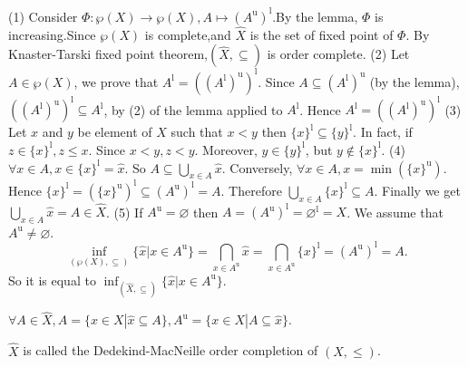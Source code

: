 \documentclass{book}
\numberwithin{equation}{section}
\begin{document}
\begin{proofenv}
    \quad
    \newline
    (1) Consider $\Phi :\wp(X)\rightarrow\wp(X),A\mapsto(A^\mathrm{u})^\mathrm{l}$.By the lemma, $\Phi $  is increasing.Since $\wp(X)$ is complete,and $\hat{X}$ is the set of fixed point of $\Phi$. By Knaster-Tarski fixed point theorem,$(\hat{X},\subseteq)$ is order complete.
    \newline
    (2) Let $A\in \wp(X)$, we prove that $A^\mathrm{l}=((A^\mathrm{l})^\mathrm{u})^\mathrm{l}$. Since $A\subseteq (A^\mathrm{l})^\mathrm{u}$ (by the lemma), $((A^\mathrm{l})^\mathrm{u})^\mathrm{l}\subseteq A^\mathrm{l}$, by (2) of the lemma applied to $A^\mathrm{l}$. Hence $A^\mathrm{l}=((A^\mathrm{l})^\mathrm{u})^\mathrm{l}$
    \newline
    (3) Let $x$ and $y$ be element of $X$ such that $x< y$ then $\{x\}^\mathrm{l}\subseteq\{y\}^\mathrm{l}$. In fact, if $z\in \{x\}^\mathrm{l},z\le x$. Since $x<y,z<y$. Moreover, $y\in \{y\}^\mathrm{l}$, but $y\notin \{x\}^\mathrm{l}$.
    \newline
    (4) $\forall x \in A,x\in \{x\}^\mathrm{l}=\hat{x}$. So $A\subseteq\bigcup_{x\in A}\hat{x}$.
    Conversely, $\forall x\in A, x=\min (\{x\}^\mathrm{u})$. Hence $\{x\}^\mathrm{l}=(\{x\}^\mathrm{u})^\mathrm{l}\subseteq (A^\mathrm{u})^\mathrm{l}=A$. Therefore $\bigcup_{x\in A}\{x\}^\mathrm{l}\subseteq A$. Finally we get $\bigcup_{x\in A}\hat{x}=A\in \hat{X}$.
    \newline
    (5) If $A^\mathrm{u}=\varnothing$ then $A=(A^\mathrm{u})^\mathrm{l}=\varnothing^\mathrm{l}=X$. We assume that $A^\mathrm{u}\not=\varnothing$.
    $$\inf _{(\wp(X),\subseteq)}\{\hat{x}|x\in A^\mathrm{u}\}=\bigcap_{x\in A^\mathrm{u}}\hat{x}=\bigcap_{x\in A^\mathrm{u}}\{x\}^\mathrm{l}=(A^\mathrm{u})^\mathrm{l}=A.$$
    So it is equal to $\inf_{(\hat{X},\subseteq)}\{\hat{x}|x\in A ^\mathrm{u}\}$.
\end{proofenv}
\begin{remark}
    $\forall A\in \hat{X},A=\{x\in X|\hat{x}\subseteq A\},A^\mathrm{u}=\{x\in X|A\subseteq \hat{x}\}$.
\end{remark}
\begin{definitionenv}
    $\hat{X}$ is called the Dedekind-MacNeille order completion of $(X,\le)$.
\end{definitionenv}
\end{document}
